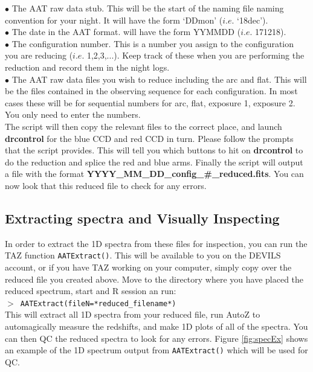 \documentclass[12pt]{article}
\begin{document}
$\bullet$ The AAT raw data stub. This will be the start of the naming file naming convention for your night. It will have the form `DDmon' ($i.e.$ `18dec').\\
$\bullet$ The date in the AAT format. will have the form YYMMDD ($i.e.$ 171218).\\
$\bullet$ The configuration number. This is a number you assign to the configuration you are reducing ($i.e.$ 1,2,3,...). Keep track of these when you are performing the reduction and record them in the night logs. \\
$\bullet$ The AAT raw data files you wish to reduce including the arc and flat. This will be the files contained in the observing sequence for each configuration. In most cases these will be for sequential numbers for arc, flat, exposure 1, exposure 2. You only need to enter the numbers.\\

The script will then copy the relevant files to the correct place, and launch \textbf{drcontrol} for the blue CCD and red CCD in turn. Please follow the prompts that the script provides. This will tell you which buttons to hit on  \textbf{drcontrol} to do the reduction and splice the red and blue arms. Finally the script will output a file with the format \textbf{YYYY\_MM\_DD\_config\_\#\_reduced.fits}. You can now look that this reduced file to check for any errors. 

\subsection{Extracting spectra and Visually Inspecting}

In order to extract the 1D spectra from these files for inspection, you can run the TAZ function \texttt{AATExtract()}. This will be available to you on the DEVILS account, or if you have TAZ working on your computer, simply copy over the reduced file you created above. Move to the directory where you have placed the reduced spectrum, start and R session an run:\\

 \texttt{$>$ AATExtract(fileN=*reduced\_filename*)}\\
 
This will extract all 1D spectra from your reduced file, run AutoZ to automagically measure the redshifts, and make 1D plots of all of the spectra. You can then QC the reduced spectra to look for any errors. Figure \ref{fig:specEx} shows an example of the 1D spectrum output from \texttt{AATExtract()} which will be used for QC.   
\end{document}

